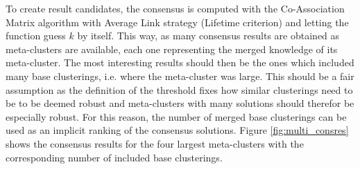 \documentclass[
	a4paper,
	english,
	twoside,
	openright,               
	11pt                            
	]{report}
\begin{document}
To create result candidates, the consensus is computed with the Co-Association Matrix algorithm with Average Link strategy (Lifetime criterion) and letting the function guess $k$ by itself. This way, as many consensus results are obtained as meta-clusters are available, each one representing the merged knowledge of its meta-cluster. The most interesting results should then be the ones which included many base clusterings, i.e. where the meta-cluster was large. This should be a fair assumption as the definition of the threshold fixes how similar clusterings need to be to be deemed robust and meta-clusters with many solutions should therefor be especially robust. For this reason, the number of merged base clusterings can be used as an implicit ranking of the consensus solutions. Figure \ref{fig:multi_consres} shows the consensus results for the four largest meta-clusters with the corresponding number of included base clusterings.
\end{document}
